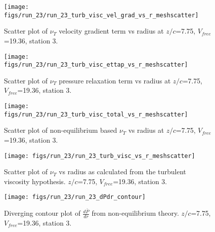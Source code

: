 \begin{figure}[H]
\centering
\texttt{[image: figs/run\_23/run\_23\_turb\_visc\_vel\_grad\_vs\_r\_meshscatter]}
\caption{Scatter plot of $\nu_T$ velocity gradient term vs radius at $z/c$=7.75, $V_{free}$=19.36, station 3.}
\end{figure}


\begin{figure}[H]
\centering
\texttt{[image: figs/run\_23/run\_23\_turb\_visc\_ettap\_vs\_r\_meshscatter]}
\caption{Scatter plot of $\nu_T$ pressure relaxation term vs radius at $z/c$=7.75, $V_{free}$=19.36, station 3.}
\end{figure}


\begin{figure}[H]
\centering
\texttt{[image: figs/run\_23/run\_23\_turb\_visc\_total\_vs\_r\_meshscatter]}
\caption{Scatter plot of non-equilibrium based $\nu_T$ vs radius at $z/c$=7.75, $V_{free}$=19.36, station 3.}
\end{figure}


\begin{figure}[H]
\centering
\texttt{[image: figs/run\_23/run\_23\_turb\_visc\_vs\_r\_meshscatter]}
\caption{Scatter plot of $\nu_T$ vs radius as calculated from the turbulent viscosity hypothesis. $z/c$=7.75, $V_{free}$=19.36, station 3.}
\end{figure}


\begin{figure}[H]
\centering
\texttt{[image: figs/run\_23/run\_23\_dPdr\_contour]}
\caption{Diverging contour plot of $\frac{d\bar{P}}{dr}$ from non-equilibrium theory. $z/c$=7.75, $V_{free}$=19.36, station 3.}
\end{figure}


